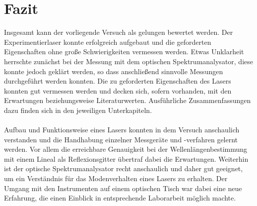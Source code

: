 \documentclass[11pt, a4paper]{article}
\numberwithin{equation}{section}
\begin{document}
\section{Fazit}
Insgesamt kann der vorliegende Versuch als gelungen bewertet werden.
Der Experimentierlaser konnte erfolgreich aufgebaut und die geforderten Eigenschaften ohne große Schwierigkeiten vermessen werden.
Etwas Unklarheit herrschte zunächst bei der Messung mit dem optischen Spektrumanalysator, diese konnte jedoch geklärt werden, so dass anschließend sinnvolle Messungen durchgeführt werden konnten.
Die zu geforderten Eigenschaften des Lasers konnten gut vermessen werden und decken sich, sofern vorhanden, mit den Erwartungen beziehungsweise Literaturwerten.
Ausführliche Zusammenfassungen dazu finden sich in den jeweiligen Unterkapiteln.\\
\\
Aufbau und Funktionsweise eines Lasers konnten in dem Versuch anschaulich verstanden und die Handhabung einzelner Messgeräte und -verfahren gelernt werden.
Vor allem die erreichbare Genauigkeit bei der Wellenlängenbestimmung mit einem Lineal als Reflexionsgitter übertraf dabei die Erwartungen.
Weiterhin ist der optische Spektrumanalysator recht anschaulich und daher gut geeignet, um ein Verständnis für das Modenverhalten eines Lasers zu erhalten.
Der Umgang mit den Instrumenten auf einem optischen Tisch war dabei eine neue Erfahrung, die einen Einblick in entsprechende Laborarbeit möglich machte.
\end{document}
